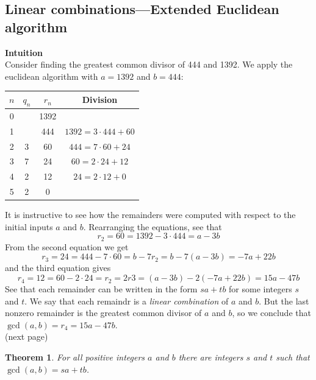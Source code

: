 \documentclass{report}
\newtheorem*{theorem}{Theorem}
\theoremstyle{definition}
\begin{document}
\subsection{Linear combinations---Extended Euclidean\\algorithm}
\textbf{Intuition}\\
Consider finding the greatest common divisor of 444 and 1392. We apply the euclidean algorithm with $a=1392$ and $b=444$:
\begin{center}
\begin{tabular}{cccc}
$n$&$q_n$&$r_n$&Division\\
\hline
0&&1392&\\
1&&444&$1392=3\cdot444+60$\\
2&3&60&$444=7\cdot60+24$\\
3&7&24&$60=2\cdot24+12$\\
4&2&12&$24=2\cdot12+0$\\
5&2&0&
\end{tabular}
\end{center}
It is instructive to see how the remainders were computed with respect to the initial inputs $a$ and $b$. Rearranging the equations, see that
\begin{equation*}
r_2=60=1392-3\cdot444=a-3b
\end{equation*}
From the second equation we get
\begin{equation*}
r_3=24=444-7\cdot60=b-7r_2=b-7(a-3b)=-7a+22b
\end{equation*}
and the third equation gives
\begin{equation*}
r_4=12=60-2\cdot24=r_2=2r3=(a-3b)-2(-7a+22b)=15a-47b
\end{equation*}
See that each remainder can be written in the form $sa+tb$ for some integers $s$ and $t$. We say that each remaindr is a \textit{linear combination} of $a$ and $b$. But
the last nonzero remainder is the greatest common divisor of $a$ and $b$, so we conclude that $\gcd(a,b)=r_4=15a-47b$.\\
(next page)\newpage
\begin{theorem}
For all positive integers $a$ and $b$ there are integers $s$ and $t$ such that $\gcd(a,b)=sa+tb$.
\end{theorem}
\end{document}
